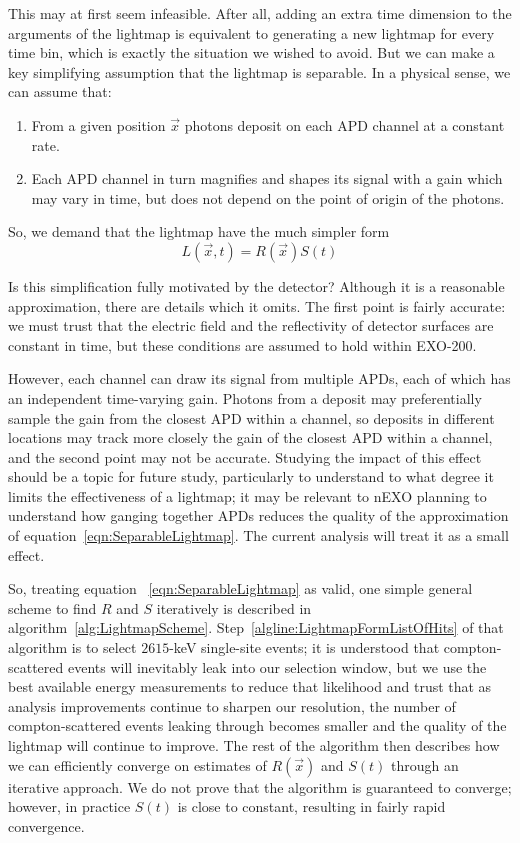 This may at first seem infeasible.  After all, adding an extra time dimension to the arguments of the lightmap is equivalent to generating a new lightmap for every time bin, which is exactly the situation we wished to avoid.  But we can make a key simplifying assumption that the lightmap is separable.  In a physical sense, we can assume that:
\begin{enumerate}
\item From a given position $\vec{x}$ photons deposit on each APD channel at a constant rate.
\item Each APD channel in turn magnifies and shapes its signal with a gain which may vary in time, but does not depend on the point of origin of the photons.
\end{enumerate}
So, we demand that the lightmap have the much simpler form
\begin{equation} \label{eqn:SeparableLightmap}
L(\vec{x},t) = R(\vec{x})S(t)
\end{equation}

Is this simplification fully motivated by the detector?  Although it is a reasonable approximation, there are details which it omits.  The first point is fairly accurate:  we must trust that the electric field and the reflectivity of detector surfaces are constant in time, but these conditions are assumed to hold within EXO-200.

However, each channel can draw its signal from multiple APDs, each of which has an independent time-varying gain.  Photons from a deposit may preferentially sample the gain from the closest APD within a channel, so deposits in different locations may track more closely the gain of the closest APD within a channel, and the second point may not be accurate.  Studying the impact of this effect should be a topic for future study, particularly to understand to what degree it limits the effectiveness of a lightmap; it may be relevant to nEXO planning to understand how ganging together APDs reduces the quality of the approximation of equation~\ref{eqn:SeparableLightmap}.  The current analysis will treat it as a small effect.

So, treating equation ~\ref{eqn:SeparableLightmap} as valid, one simple general scheme to find $R$ and $S$ iteratively is described in algorithm~\ref{alg:LightmapScheme}.  Step~\ref{algline:LightmapFormListOfHits} of that algorithm is to select $2615$-keV single-site events; it is understood that compton-scattered events will inevitably leak into our selection window, but we use the best available energy measurements to reduce that likelihood and trust that as analysis improvements continue to sharpen our resolution, the number of compton-scattered events leaking through becomes smaller and the quality of the lightmap will continue to improve.  The rest of the algorithm then describes how we can efficiently converge on estimates of $R(\vec{x})$ and $S(t)$ through an iterative approach.  We do not prove that the algorithm is guaranteed to converge; however, in practice $S(t)$ is close to constant, resulting in fairly rapid convergence.

